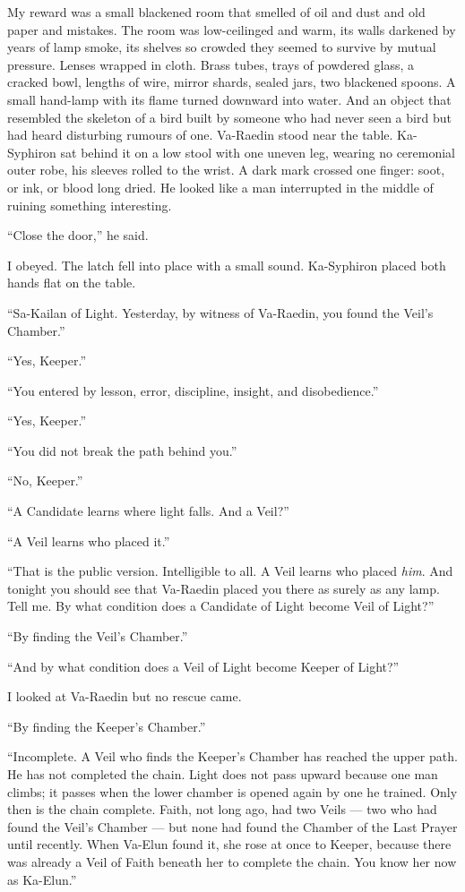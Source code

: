 My reward was a small blackened room that smelled of oil and dust and old paper and mistakes. The room was low-ceilinged and warm, its walls darkened by years of lamp smoke, its shelves so crowded they seemed to survive by mutual pressure. Lenses wrapped in cloth. Brass tubes, trays of powdered glass, a cracked bowl, lengths of wire, mirror shards, sealed jars, two blackened spoons. A small hand-lamp with its flame turned downward into water. And an object that resembled the skeleton of a bird built by someone who had never seen a bird but had heard disturbing rumours of one. Va-Raedin stood near the table. Ka-Syphiron sat behind it on a low stool with one uneven leg, wearing no ceremonial outer robe, his sleeves rolled to the wrist. A dark mark crossed one finger: soot, or ink, or blood long dried. He looked like a man interrupted in the middle of ruining something interesting.\par

``Close the door,'' he said. \par

I obeyed. The latch fell into place with a small sound. Ka-Syphiron placed both hands flat on the table.\par

``Sa-Kailan of Light. Yesterday, by witness of Va-Raedin, you found the Veil's Chamber.''\par
``Yes, Keeper.''\par
``You entered by lesson, error, discipline, insight, and disobedience.''\par
``Yes, Keeper.''\par
``You did not break the path behind you.''\par
``No, Keeper.''\par
``A Candidate learns where light falls. And a Veil?''\par
``A Veil learns who placed it.''\par
``That is the public version. Intelligible to all. A Veil learns who placed \textit{him}. And tonight you should see that Va-Raedin placed you there as surely as any lamp. Tell me. By what condition does a Candidate of Light become Veil of Light?''\par
``By finding the Veil's Chamber.''\par
``And by what condition does a Veil of Light become Keeper of Light?''\par
I looked at Va-Raedin but no rescue came.\par
``By finding the Keeper's Chamber.''\par
``Incomplete. A Veil who finds the Keeper's Chamber has reached the upper path. He has not completed the chain. Light does not pass upward because one man climbs; it passes when the lower chamber is opened again by one he trained. Only then is the chain complete. Faith, not long ago, had two Veils --- two who had found the Veil's Chamber --- but none had found the Chamber of the Last Prayer until recently. When Va-Elun found it, she rose at once to Keeper, because there was already a Veil of Faith beneath her to complete the chain. You know her now as Ka-Elun.''\par

